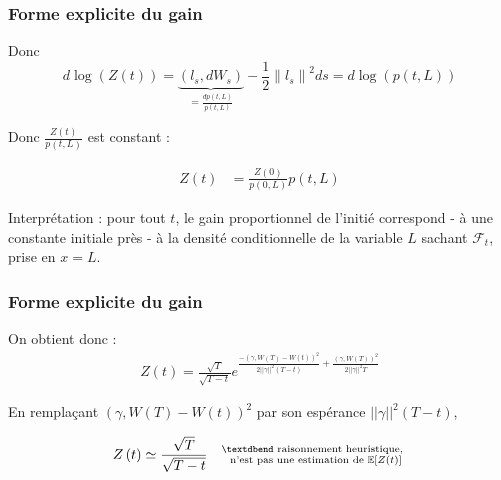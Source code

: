 \documentclass{beamer}
\begin{document}
\begin{frame}
\frametitle{Forme explicite du gain}
\par Donc
\begin{displaymath}
d \log \left( Z \left( t \right) \right) = \underbrace{\left(l_s, d W_s \right)}_{ = \frac{d p \left( t, L \right)}{p \left( t, L \right)}} - \frac{1}{2} {\| l_{s} \|}^{2} ds = d \log \left( p \left( t, L \right) \right)
\end{displaymath}

\par Donc $\frac{Z \left( t \right)}{ p \left( t, L \right) }$ est constant :

\begin{displaymath}
	\begin{split}
	Z \left( t \right) &= \frac{Z \left( 0 \right)}{ p \left( 0, L \right) } p \left( t, L \right)
	\end{split}
\end{displaymath}
\par Interprétation : pour tout $t$, le gain proportionnel de l'initié correspond - à une constante initiale près -  à la densité conditionnelle de la variable $L$ sachant $\mathcal{F}_t$, prise en $x = L$.
\end{frame}
 
\begin{frame}
\frametitle{Forme explicite du gain}
\par On obtient donc :
\begin{displaymath}
	\begin{split}
		\boxed{
	Z \left( t \right) = \frac{\sqrt{T}}{\sqrt{T - t}} e^{\frac{- \left( \gamma, W \left( T \right) - W \left( t \right) \right)^2}{2 ||\gamma||^2 \left( T - t \right)} + \frac{\left( \gamma, W \left( T \right) \right)^2}{2 ||\gamma||^2 T }}
		}
	\end{split}
\end{displaymath}
\par En remplaçant $ \left( \gamma, W \left( T \right) - W \left( t \right) \right)^2 $ par son espérance $||\gamma||^2 \left( T - t \right)  $,

\begin{displaymath}
	Z \left( t \right) \simeq \frac{\sqrt{T}}{\sqrt{T - t}} \quad \substack{\text{\textdbend raisonnement heuristique, } \\ \text{ n'est pas une estimation de } \mathbb{E} \left[ Z \left( t \right) \right]}
\end{displaymath}

\end{frame}
\end{document}
